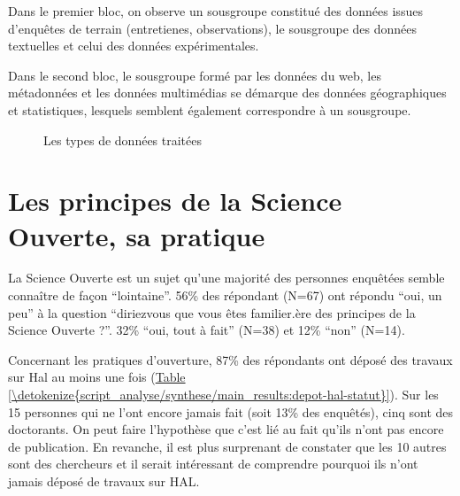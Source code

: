 \documentclass[letterpaper,10pt,english]{jupyterBook}
\begin{document}
\sphinxAtStartPar
Dans le premier bloc, on observe un sous\sphinxhyphen{}groupe constitué des données issues d’enquêtes de terrain (entretienes, observations), le sous\sphinxhyphen{}groupe des données textuelles et celui des données expérimentales.

\sphinxAtStartPar
Dans le second bloc, le sous\sphinxhyphen{}groupe formé par les données du web, les métadonnées et les données multimédias se démarque des données géographiques et statistiques, lesquels semblent également correspondre à un sous\sphinxhyphen{}groupe.

\sphinxAtStartPar
{}

\begin{figure}[htbp]
\centering
\capstart

\noindent{}
\caption{Les types de données traitées}\label{\detokenize{script_analyse/synthese/main_results:matrice-type-datas}}\end{figure}


\section{Les principes de la Science Ouverte, sa pratique}
\label{\detokenize{script_analyse/synthese/main_results:les-principes-de-la-science-ouverte-sa-pratique}}
\sphinxAtStartPar
La Science Ouverte est un sujet qu’une majorité des personnes enquêtées semble connaître de façon “lointaine”. 56\% des répondant (N=67) ont répondu “oui, un peu” à la question “diriez\sphinxhyphen{}vous que vous êtes familier.ère des principes de la Science Ouverte ?”. 32\% “oui, tout à fait” (N=38) et 12\% “non” (N=14).

\sphinxAtStartPar
Concernant les pratiques d’ouverture, 87\% des répondants ont déposé des travaux sur Hal au moins une fois (\hyperref[\detokenize{script_analyse/synthese/main_results:depot-hal-statut}]{Table \ref{\detokenize{script_analyse/synthese/main_results:depot-hal-statut}}}). Sur les 15 personnes qui ne l’ont encore jamais fait (soit 13\% des enquêtés), cinq sont des doctorants. On peut faire l’hypothèse que c’est lié au fait qu’ils n’ont pas encore de publication. En revanche, il est plus surprenant de constater que les 10 autres sont des chercheurs et il serait intéressant de comprendre pourquoi ils n’ont jamais déposé de travaux sur HAL.
\end{document}

